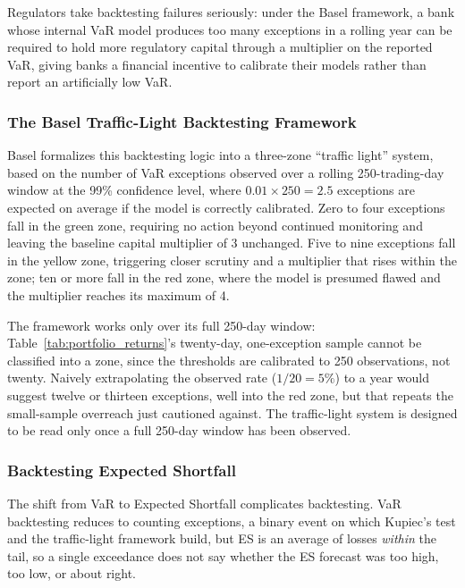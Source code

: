 \documentclass[../ai_in_finance]{subfiles}
\begin{document}
Regulators take backtesting failures seriously: under the Basel framework, a bank whose internal VaR model produces too many exceptions in a rolling year can be required to hold more regulatory capital through a multiplier on the reported VaR, giving banks a financial incentive to calibrate their models rather than report an artificially low VaR.

\subsubsection*{The Basel Traffic-Light Backtesting Framework}

Basel formalizes this backtesting logic into a three-zone ``traffic light'' system, based on the number of VaR exceptions observed over a rolling 250-trading-day window at the 99\% confidence level, where $0.01 \times 250 = 2.5$ exceptions are expected on average if the model is correctly calibrated. Zero to four exceptions fall in the green zone, requiring no action beyond continued monitoring and leaving the baseline capital multiplier of 3 unchanged.
Five to nine exceptions fall in the yellow zone, triggering closer scrutiny and a multiplier that rises within the zone; ten or more fall in the red zone, where the model is presumed flawed and the multiplier reaches its maximum of 4.

The framework works only over its full 250-day window: Table~\ref{tab:portfolio_returns}'s twenty-day, one-exception sample cannot be classified into a zone, since the thresholds are calibrated to 250 observations, not twenty.
Naively extrapolating the observed rate ($1/20=5\%$) to a year would suggest twelve or thirteen exceptions, well into the red zone, but that repeats the small-sample overreach just cautioned against. The traffic-light system is designed to be read only once a full 250-day window has been observed.

\subsubsection*{Backtesting Expected Shortfall}

The shift from VaR to Expected Shortfall complicates backtesting. VaR backtesting reduces to counting exceptions, a binary event on which Kupiec's test and the traffic-light framework build, but ES is an average of losses \emph{within} the tail, so a single exceedance does not say whether the ES forecast was too high, too low, or about right.
\end{document}
